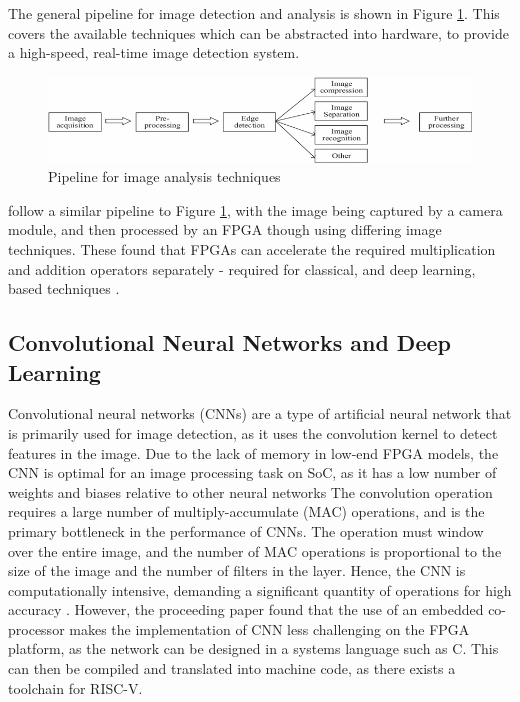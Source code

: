 The general pipeline for image detection and analysis is shown in Figure \ref{fig:pipeline}. 
This covers the available techniques which can be abstracted into hardware, to provide a high-speed, real-time image detection system.

\begin{figure}[h]
    \centering
    \includegraphics[width=1\textwidth]{Assets/Pipeline.png}
    \caption{Pipeline for image analysis techniques \cite{RTEdge}}
    \label{fig:pipeline}
\end{figure}

\cite{SoCImage, Aerial} follow a similar pipeline to Figure \ref{fig:pipeline}, with the image being captured by a camera module, and then processed by an FPGA though using differing image techniques.
These found that FPGAs can accelerate the required multiplication and addition operators separately - required for classical, and deep learning, based techniques \cite{ResourceEfficient}.


\subsection{Convolutional Neural Networks and Deep Learning}
Convolutional neural networks (CNNs) are a type of artificial neural network that is primarily used for image detection, as it uses the convolution kernel to detect features in the image.
Due to the lack of memory in low-end FPGA models, the CNN is optimal for an image processing task on SoC, as it has a low number of weights and biases relative to other neural networks \cite{Drowsiness}
The convolution operation requires a large number of multiply-accumulate (MAC) operations, and is the primary bottleneck in the performance of CNNs.
The operation must window over the entire image, and the number of MAC operations is proportional to the size of the image and the number of filters in the layer.
Hence, the CNN is computationally intensive, demanding a significant quantity of operations for high accuracy \cite{Linear}.
However, the proceeding \cite{Drowsiness} paper found that the use of an embedded co-processor makes the implementation of CNN less challenging on the FPGA platform, as the network can be designed in a systems language such as C.
This can then be compiled and translated into machine code, as there exists a toolchain for RISC-V.


